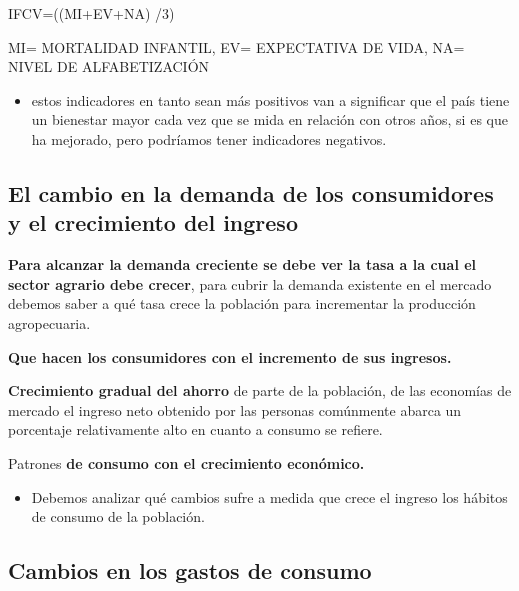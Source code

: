 \documentclass[
  letterpaper,
  DIV=11,
  numbers=noendperiod]{scrartcl}
\providecommand{\tightlist}{%
  \setlength{\itemsep}{0pt}\setlength{\parskip}{0pt}}\usepackage{longtable,booktabs,array}
\begin{document}
IFCV=((MI+EV+NA) /3)

MI= MORTALIDAD INFANTIL, EV= EXPECTATIVA DE VIDA, NA= NIVEL DE
ALFABETIZACIÓN

\begin{itemize}
\tightlist
\item
  estos indicadores en tanto sean más positivos van a significar que el
  país tiene un bienestar mayor cada vez que se mida en relación con
  otros años, si es que ha mejorado, pero podríamos tener indicadores
  negativos.
\end{itemize}

\hypertarget{el-cambio-en-la-demanda-de-los-consumidores-y-el-crecimiento-del-ingreso}{%
\subsection{El cambio en la demanda de los consumidores y el crecimiento
del
ingreso}\label{el-cambio-en-la-demanda-de-los-consumidores-y-el-crecimiento-del-ingreso}}

\textbf{Para alcanzar la demanda creciente se debe ver la tasa a la cual
el sector agrario debe crecer}, para cubrir la demanda existente en el
mercado debemos saber a qué tasa crece la población para incrementar la
producción agropecuaria.

\textbf{Que hacen los consumidores con el incremento de sus ingresos.}

\textbf{Crecimiento gradual del ahorro} de parte de la población, de las
economías de mercado el ingreso neto obtenido por las personas
comúnmente abarca un porcentaje relativamente alto en cuanto a consumo
se refiere.

Patrones \textbf{de consumo con el crecimiento económico.}

\begin{itemize}
\tightlist
\item
  Debemos analizar qué cambios sufre a medida que crece el ingreso los
  hábitos de consumo de la población.
\end{itemize}

\hypertarget{cambios-en-los-gastos-de-consumo}{%
\subsection{Cambios en los gastos de
consumo}\label{cambios-en-los-gastos-de-consumo}}
\end{document}
